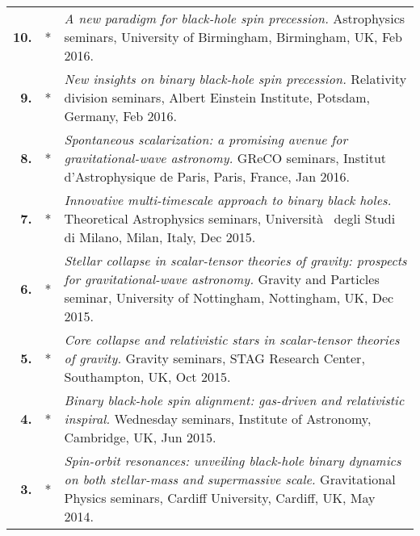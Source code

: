 {\begin{longtable}{rp{0.3cm}p{15.8cm}}
%
\textbf{10.} & * & \textit{A new paradigm for black-hole spin precession.}
\newline{}
Astrophysics seminars, University of Birmingham, Birmingham, UK, Feb 2016.
\vspace{0.05cm}\\
%
\textbf{9.} & * & \textit{New insights on binary black-hole spin precession.}
\newline{}
Relativity division seminars, Albert Einstein Institute, Potsdam, Germany, Feb 2016.
\vspace{0.05cm}\\
%
\textbf{8.} & * & \textit{Spontaneous scalarization: a promising avenue for gravitational-wave astronomy.}
\newline{}
GReCO seminars, Institut d'Astrophysique de Paris, Paris, France, Jan 2016.
\vspace{0.05cm}\\
%
\textbf{7.} & * & \textit{Innovative multi-timescale approach to binary black holes.}
\newline{}
Theoretical Astrophysics seminars, Universit\`{a}  degli Studi di Milano, Milan, Italy, Dec 2015.
\vspace{0.05cm}\\
%
\textbf{6.} & * & \textit{Stellar collapse in scalar-tensor theories of gravity: prospects for gravitational-wave astronomy.}
\newline{}
Gravity and Particles seminar, University of Nottingham, Nottingham, UK, Dec 2015.
\vspace{0.05cm}\\
%
\textbf{5.} & * & \textit{Core collapse and relativistic stars in scalar-tensor theories of gravity.}
\newline{}
Gravity seminars, STAG Research Center, Southampton, UK, Oct 2015.
\vspace{0.05cm}\\
%
\textbf{4.} & * & \textit{Binary black-hole spin alignment: gas-driven and relativistic inspiral.}
\newline{}
Wednesday seminars, Institute of Astronomy, Cambridge, UK, Jun 2015.
\vspace{0.05cm}\\
%
\textbf{3.} & * & \textit{Spin-orbit resonances: unveiling black-hole binary dynamics on both stellar-mass and supermassive scale.}
\newline{}
Gravitational Physics seminars, Cardiff University, Cardiff, UK, May 2014.
\vspace{0.05cm}\\

\end{longtable}}
